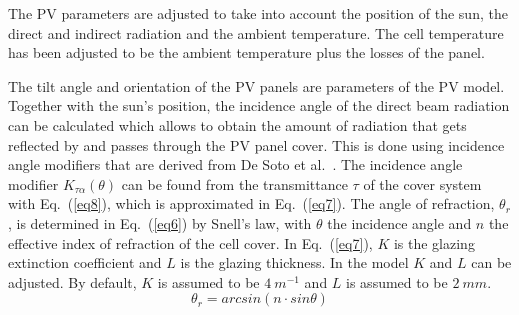 The PV parameters are adjusted to take into account the position of the sun, the direct and indirect radiation and the ambient temperature. The cell temperature has been adjusted to be the ambient temperature plus the losses of the panel.

The tilt angle and orientation of the PV panels are parameters of the PV model. Together with the sun's position, the incidence angle of the direct beam radiation can be calculated which allows to obtain the amount of radiation that gets reflected by and passes through the PV panel cover. This is done using incidence angle modifiers that are derived from De Soto et al.~\cite{desoto}. The incidence angle modifier $K_{\tau \alpha}(\theta)$ can be found from the transmittance $\tau$ of the cover system with Eq.~(\ref{eq8}), which is approximated in Eq.~(\ref{eq7}). The angle of refraction, $\theta _{r}$, is determined in Eq.~(\ref{eq6}) by Snell's law, with $\theta$ the incidence angle and $n$ the effective index of refraction of the cell cover. In Eq.~(\ref{eq7}), $K$ is the glazing extinction coefficient and $L$ is the glazing thickness. In the model $K$ and $L$ can be adjusted. By default, $K$ is assumed to be $4~m^{-1}$ and $L$ is assumed to be $2~mm$.
\begin{equation}
\theta _{r} = arcsin(n \cdot sin \theta)
\label{eq6}
\end{equation}
